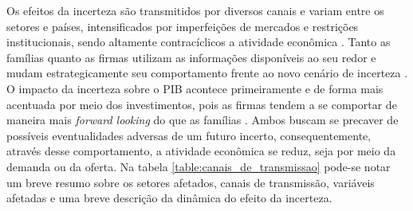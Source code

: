 Os efeitos da incerteza são transmitidos por diversos canais e variam entre os setores e países, intensificados por imperfeições de mercados e restrições institucionais, sendo altamente contracíclicos a atividade econômica \cite{FMI2012outlook}. Tanto as famílias quanto as firmas utilizam as informações disponíveis ao seu redor e mudam estrategicamente seu comportamento frente ao novo cenário de incerteza \cite{haddow2013macroeconomic}. O impacto da incerteza sobre o \gls{PIB} acontece primeiramente e de forma mais acentuada por meio dos investimentos, pois as firmas tendem a se comportar de maneira mais \textit{forward looking} do que as famílias \cite{bloom2017observations}. Ambos buscam se precaver de possíveis eventualidades adversas de um futuro incerto, consequentemente, através desse comportamento, a atividade econômica se reduz, seja por meio da demanda ou da oferta. Na tabela \ref{table:canais_de_transmissao} pode-se notar um breve resumo sobre os setores afetados, canais de transmissão, variáveis afetadas e uma breve descrição da dinâmica do efeito da incerteza.

